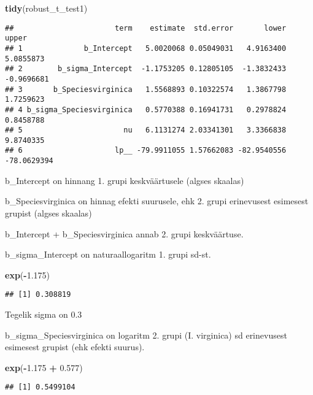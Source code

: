 \documentclass[]{article}
\newenvironment{Shaded}{\begin{snugshade}}{\end{snugshade}}
\newcommand{\KeywordTok}[1]{\textcolor[rgb]{0.13,0.29,0.53}{\textbf{#1}}}
\newcommand{\FloatTok}[1]{\textcolor[rgb]{0.00,0.00,0.81}{#1}}
\newcommand{\StringTok}[1]{\textcolor[rgb]{0.31,0.60,0.02}{#1}}
\newcommand{\OperatorTok}[1]{\textcolor[rgb]{0.81,0.36,0.00}{\textbf{#1}}}
\newcommand{\NormalTok}[1]{#1}
\begin{document}
\begin{Shaded}
\begin{Highlighting}[]
\KeywordTok{tidy}\NormalTok{(robust_t_test1)}
\end{Highlighting}
\end{Shaded}

\begin{verbatim}
##                       term    estimate  std.error       lower       upper
## 1              b_Intercept   5.0020068 0.05049031   4.9163400   5.0855873
## 2        b_sigma_Intercept  -1.1753205 0.12805105  -1.3832433  -0.9696681
## 3       b_Speciesvirginica   1.5568893 0.10322574   1.3867798   1.7259623
## 4 b_sigma_Speciesvirginica   0.5770388 0.16941731   0.2978824   0.8458788
## 5                       nu   6.1131274 2.03341301   3.3366838   9.8740335
## 6                     lp__ -79.9911055 1.57662083 -82.9540556 -78.0629394
\end{verbatim}

b\_Intercept on hinnang 1. grupi keskväärtusele (algses skaalas)

b\_Speciesvirginica on hinnag efekti suurusele, ehk 2. grupi erinevusest
esimesest grupist (algses skaalas)

b\_Intercept + b\_Speciesvirginica annab 2. grupi keskväärtuse.

b\_sigma\_Intercept on naturaallogaritm 1. grupi sd-st.

\begin{Shaded}
\begin{Highlighting}[]
\KeywordTok{exp}\NormalTok{(}\OperatorTok{-}\FloatTok{1.175}\NormalTok{)}
\end{Highlighting}
\end{Shaded}

\begin{verbatim}
## [1] 0.308819
\end{verbatim}

Tegelik sigma on 0.3

b\_sigma\_Speciesvirginica on logaritm 2. grupi (I. virginica) sd
erinevusest esimesest grupist (ehk efekti suurus).

\begin{Shaded}
\begin{Highlighting}[]
\KeywordTok{exp}\NormalTok{(}\OperatorTok{-}\FloatTok{1.175} \OperatorTok{+}\StringTok{ }\FloatTok{0.577}\NormalTok{)}
\end{Highlighting}
\end{Shaded}

\begin{verbatim}
## [1] 0.5499104
\end{verbatim}
\end{document}
